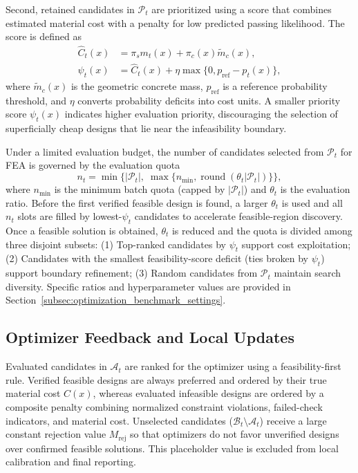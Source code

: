 Second, retained candidates in $\mathcal{P}_t$ are prioritized using a score that combines estimated material cost with a penalty for low predicted passing likelihood. The score is defined as
\begin{equation}
\begin{aligned}
\widehat C_t(x)&=\pi_s m_t(x)+\pi_c(x)\widetilde m_c(x),\\
\psi_t(x)&=\widehat C_t(x)+\eta\max\{0,p_{\mathrm{ref}}-p_t(x)\},
\end{aligned}
\label{eq:calibrated_priority_score}
\end{equation}
where $\widetilde m_c(x)$ is the geometric concrete mass, $p_{\mathrm{ref}}$ is a reference probability threshold, and $\eta$ converts probability deficits into cost units. A smaller priority score $\psi_t(x)$ indicates higher evaluation priority, discouraging the selection of superficially cheap designs that lie near the infeasibility boundary.

Under a limited evaluation budget, the number of candidates selected from $\mathcal{P}_t$ for FEA is governed by the evaluation quota
\begin{equation}
n_t=\min\{|\mathcal{P}_t|,\;\max\{n_{\min},\operatorname{round}(\theta_t|\mathcal{P}_t|)\}\},
\label{eq:evaluation_quota}
\end{equation}
where $n_{\min}$ is the minimum batch quota (capped by $|\mathcal{P}_t|$) and $\theta_t$ is the evaluation ratio. Before the first verified feasible design is found, a larger $\theta_t$ is used and all $n_t$ slots are filled by lowest-$\psi_t$ candidates to accelerate feasible-region discovery. Once a feasible solution is obtained, $\theta_t$ is reduced and the quota is divided among three disjoint subsets: (1) Top-ranked candidates by $\psi_t$ support cost exploitation; (2) Candidates with the smallest feasibility-score deficit (ties broken by $\psi_t$) support boundary refinement; (3) Random candidates from $\mathcal{P}_t$ maintain search diversity. Specific ratios and hyperparameter values are provided in Section~\ref{subsec:optimization_benchmark_settings}.

\subsection{Optimizer Feedback and Local Updates}
\label{subsec:online_update_framework}

Evaluated candidates in $\mathcal{A}_t$ are ranked for the optimizer using a feasibility-first rule. Verified feasible designs are always preferred and ordered by their true material cost $C(x)$, whereas evaluated infeasible designs are ordered by a composite penalty combining normalized constraint violations, failed-check indicators, and material cost. Unselected candidates ($\mathcal{B}_t \setminus \mathcal{A}_t$) receive a large constant rejection value $M_{\mathrm{rej}}$ so that optimizers do not favor unverified designs over confirmed feasible solutions. This placeholder value is excluded from local calibration and final reporting.

